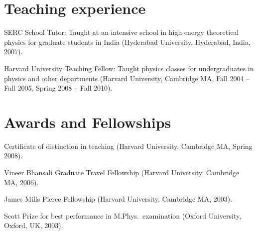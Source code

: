 \documentclass[letterpaper,10pt,notopicbreak,titleabove,plain]{simplecv}
\begin{document}
%
%

\section{Teaching experience}
\begin{topic}
  \item[SERC School Tutor:] Taught at an intensive school in high energy theoretical physics for graduate students in India (Hyderabad University, Hyderabad, India, 2007).

  \item[Harvard University Teaching Fellow:] Taught physics classes for undergraduates in physics and other departments (Harvard University, Cambridge MA, Fall 2004 -- Fall 2005, Spring 2008 -- Fall 2010).

\end{topic}

\section{Awards and Fellowships}
\begin{topic}
   \item   Certificate of distinction in teaching (Harvard University, Cambridge MA, Spring 2008).
   \item   Vineer Bhansali Graduate Travel Fellowship (Harvard University, Cambridge MA, 2006).
   \item   James Mills Pierce Fellowship (Harvard University, Cambridge MA, 2003).
   \item   Scott Prize for best performance in M.Phys.\ examination (Oxford University, Oxford, UK, 2003).
\end{topic}
\end{document}
